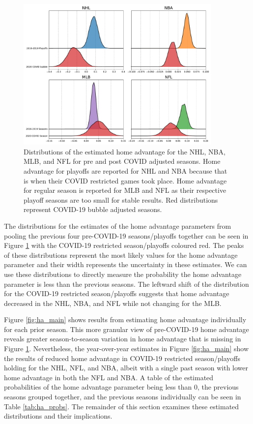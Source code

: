 \begin{figure}
	\centering
	\includegraphics[width=0.9\textwidth]{figures/Figure_1.pdf}
	\caption{Distributions of the estimated home advantage for the NHL, NBA, MLB, and NFL for pre and post COVID adjusted seasons. Home advantage for playoffs are reported for NHL and NBA because that is when their COVID restricted games took place. Home advantage for regular season is reported for MLB and NFL as their respective playoff seasons are too small for stable results. Red distributions represent COVID-19 bubble adjusted seasons.}
	\label{fig:ha_pooled}
\end{figure}

The distributions for the estimates of the home advantage parameters from pooling the previous four pre-COVID-19 seasons/playoffs together can be seen in Figure \mbox{\ref{fig:ha_pooled}} with the COVID-19 restricted season/playoffs coloured red. The peaks of these distributions represent the most likely values for the home advantage parameter and their width represents the uncertainty in these estimates. We can use these distributions to directly measure the probability the home advantage parameter is less than the previous seasons. The leftward shift of the distribution for the COVID-19 restricted season/playoffs suggests that home advantage decreased in the NHL, NBA, and NFL while not changing for the MLB.

Figure \mbox{\ref{fig:ha_main}} shows results from estimating home advantage individually for each prior season. This more granular view of pre-COVID-19 home advantage reveals greater season-to-season variation in home advantage that is missing in Figure \mbox{\ref{fig:ha_pooled}}. Nevertheless, the year-over-year estimates in Figure \mbox{\ref{fig:ha_main}} show the results of reduced home advantage in COVID-19 restricted season/playoffs holding for the NHL, NFL, and NBA, albeit with a single past season with lower home advantage in both the NFL and NBA. A table of the estimated probabilities of the home advantage parameter being less than 0, the previous seasons grouped together, and the previous seasons individually can be seen in Table \ref{tab:ha_probs}. The remainder of this section examines these estimated distributions and their implications.

